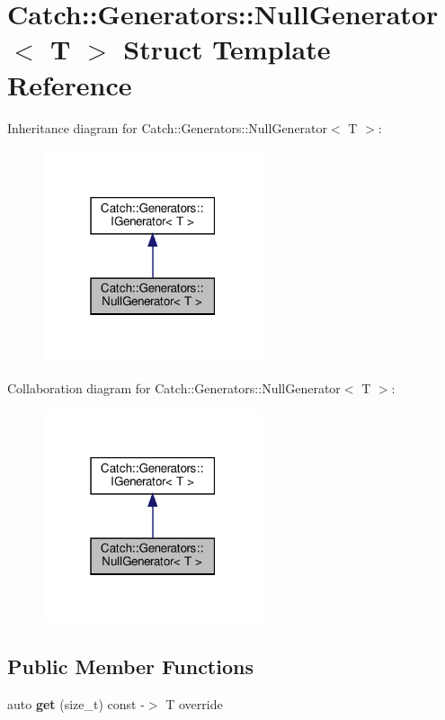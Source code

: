 \hypertarget{structCatch_1_1Generators_1_1NullGenerator}{}\section{Catch\+::Generators\+::Null\+Generator$<$ T $>$ Struct Template Reference}
\label{structCatch_1_1Generators_1_1NullGenerator}


Inheritance diagram for Catch\+::Generators\+::Null\+Generator$<$ T $>$\+:
\nopagebreak
\begin{figure}[H]
\begin{center}
\leavevmode
\includegraphics[width=183pt]{structCatch_1_1Generators_1_1NullGenerator__inherit__graph}
\end{center}
\end{figure}


Collaboration diagram for Catch\+::Generators\+::Null\+Generator$<$ T $>$\+:
\nopagebreak
\begin{figure}[H]
\begin{center}
\leavevmode
\includegraphics[width=183pt]{structCatch_1_1Generators_1_1NullGenerator__coll__graph}
\end{center}
\end{figure}
\subsection*{Public Member Functions}
\begin{DoxyCompactItemize}
\item 
\mbox{\label{structCatch_1_1Generators_1_1NullGenerator_a17a2cc82d644e97afded4017c7a062ef}} 
auto {\bfseries get} (size\+\_\+t) const -\/$>$ T override
\end{DoxyCompactItemize}


